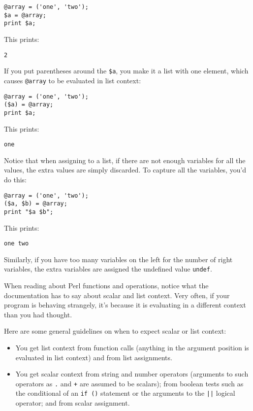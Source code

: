 \begin{lstlisting}
@array = ('one', 'two');
$a = @array;
print $a;
\end{lstlisting}

This prints:

\begin{lstlisting}
2
\end{lstlisting}

If you put parentheses around the \verb|$a|, you make it a list with one element, which causes \verb|@array| to be evaluated in list context:

\begin{lstlisting}
@array = ('one', 'two');
($a) = @array;
print $a;
\end{lstlisting}

This prints:

\begin{lstlisting}
one
\end{lstlisting}

Notice that when assigning to a list, if there are not enough variables for all the values, the extra values are simply discarded. To capture all the variables, you'd do this:

\begin{lstlisting}
@array = ('one', 'two');
($a, $b) = @array;
print "$a $b";
\end{lstlisting}

This prints:

\begin{lstlisting}
one two
\end{lstlisting}

Similarly, if you have too many variables on the left for the number of right variables, the extra variables are assigned the undefined value \verb|undef|.

When reading about Perl functions and operations, notice what the documentation has to say about scalar and list context. Very often, if your program is behaving strangely, it's because it is evaluating in a different context than you had thought.

Here are some general guidelines on when to expect scalar or list context:

\begin{itemize}
  \item You get list context from function calls (anything in the argument position is evaluated in list context) and from list assignments.
  \item You get scalar context from string and number operators (arguments to such operators as \verb|.| and \verb|+| are assumed to be scalars); from boolean tests such as the conditional of an \verb|if ()| statement or the arguments to the \verb=||= logical operator; and from scalar assignment.
\end{itemize}

